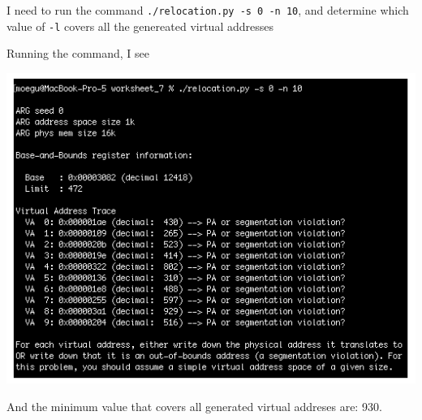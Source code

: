 \documentclass[12pt]{article}
\begin{document}
\begin{enumerate}[1.]
    I need to run the command \texttt{./relocation.py -s 0 -n 10}, and determine which
    value of \texttt{-l} covers all the genereated virtual addresses

    \bigskip

    Running the command, I see

    \begin{center}
    \includegraphics[width=0.8\linewidth]{images/worksheet_7_solution_4.png}
    \end{center}

    \bigskip

    And the minimum value that covers all generated virtual addreses are: 930.

\end{enumerate}
\end{document}
